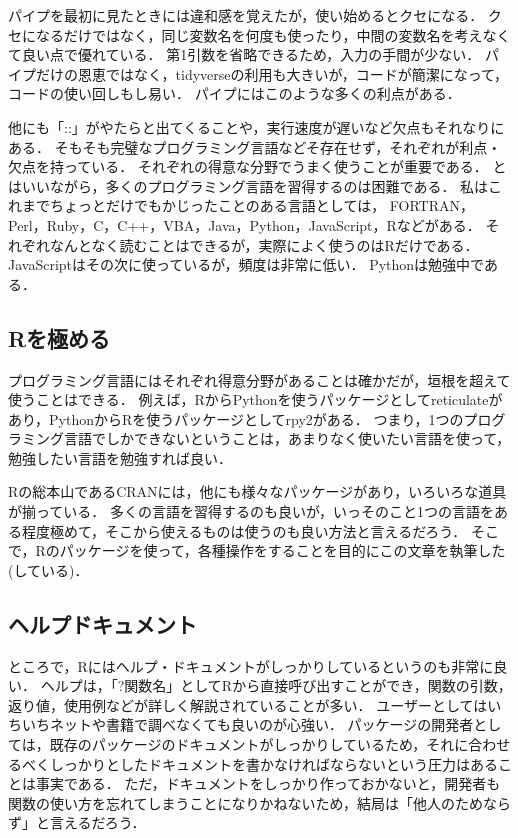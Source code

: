 \documentclass[
]{article}
\begin{document}
パイプを最初に見たときには違和感を覚えたが，使い始めるとクセになる．
クセになるだけではなく，同じ変数名を何度も使ったり，中間の変数名を考えなくて良い点で優れている．
第1引数を省略できるため，入力の手間が少ない．
パイプだけの恩恵ではなく，tidyverseの利用も大きいが，コードが簡潔になって，コードの使い回しもし易い．
パイプにはこのような多くの利点がある．

他にも「::」がやたらと出てくることや，実行速度が遅いなど欠点もそれなりにある．
そもそも完璧なプログラミング言語などそ存在せず，それぞれが利点・欠点を持っている．
それぞれの得意な分野でうまく使うことが重要である．
とはいいながら，多くのプログラミング言語を習得するのは困難である．
私はこれまでちょっとだけでもかじったことのある言語としては，
FORTRAN，Perl，Ruby，C，C++，VBA，Java，Python，JavaScript，Rなどがある．
それぞれなんとなく読むことはできるが，実際によく使うのはRだけである．
JavaScriptはその次に使っているが，頻度は非常に低い．
Pythonは勉強中である．

\hypertarget{rux3092ux6975ux3081ux308b}{%
\subsection{Rを極める}\label{rux3092ux6975ux3081ux308b}}

プログラミング言語にはそれぞれ得意分野があることは確かだが，垣根を超えて使うことはできる．
例えば，RからPythonを使うパッケージとしてreticulateがあり，PythonからRを使うパッケージとしてrpy2がある．
つまり，1つのプログラミング言語でしかできないということは，あまりなく使いたい言語を使って，勉強したい言語を勉強すれば良い．

Rの総本山であるCRANには，他にも様々なパッケージがあり，いろいろな道具が揃っている．
多くの言語を習得するのも良いが，いっそのこと1つの言語をある程度極めて，そこから使えるものは使うのも良い方法と言えるだろう．
そこで，Rのパッケージを使って，各種操作をすることを目的にこの文章を執筆した(している)．

\hypertarget{ux30d8ux30ebux30d7ux30c9ux30adux30e5ux30e1ux30f3ux30c8}{%
\subsection{ヘルプドキュメント}\label{ux30d8ux30ebux30d7ux30c9ux30adux30e5ux30e1ux30f3ux30c8}}

ところで，Rにはヘルプ・ドキュメントがしっかりしているというのも非常に良い．
ヘルプは，「?関数名」としてRから直接呼び出すことができ，関数の引数，返り値，使用例などが詳しく解説されていることが多い．
ユーザーとしてはいちいちネットや書籍で調べなくても良いのが心強い．
パッケージの開発者としては，既存のパッケージのドキュメントがしっかりしているため，それに合わせるべくしっかりとしたドキュメントを書かなければならないという圧力はあることは事実である．
ただ，ドキュメントをしっかり作っておかないと，開発者も関数の使い方を忘れてしまうことになりかねないため，結局は「他人のためならず」と言えるだろう．
\end{document}

